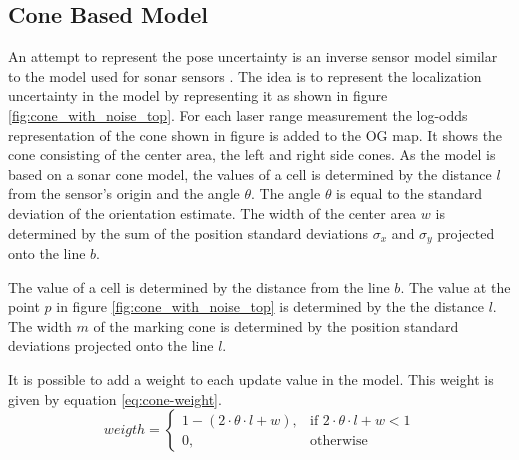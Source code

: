 
\subsection{Cone Based Model}
An attempt to represent the pose uncertainty is an inverse sensor model similar to the model used for sonar sensors  \cite{probRob}.  
The idea is to represent the localization uncertainty in the model by representing it as shown in figure \vref{fig:cone_with_noise_top}.
For each laser range measurement the log-odds representation of the cone shown in figure is added to the OG map.
It shows the cone consisting of the center area, the left and right side cones. 
As the model is based on a sonar cone model, the values of a cell is determined by the distance \(l\) from the sensor's origin and the angle \(\theta\). 
The angle \(\theta\) is equal to the standard deviation of the orientation estimate. 
The width of the center area $w$ is determined by the sum of the position standard deviations $\sigma_x$ and $\sigma_y$ projected onto the line $b$. 

The value of a cell is determined by the distance from the line $b$. 
The value at the point $p$ in figure \vref{fig:cone_with_noise_top} is determined by the the distance \(l\).
The width $m$ of the marking cone is determined by the position standard deviations projected onto the line $l$.

It is possible to add a weight to each update value in the model. This weight is given by equation \vref{eq:cone-weight}.
\begin{equation}
\label{eq:cone-weight}
weigth = 
\begin{cases}
1 - ( 2 \cdot \theta \cdot l + w), & \text{if } 2 \cdot \theta \cdot l + w < 1\\
0, & \text{otherwise}
\end{cases}
\end{equation}


